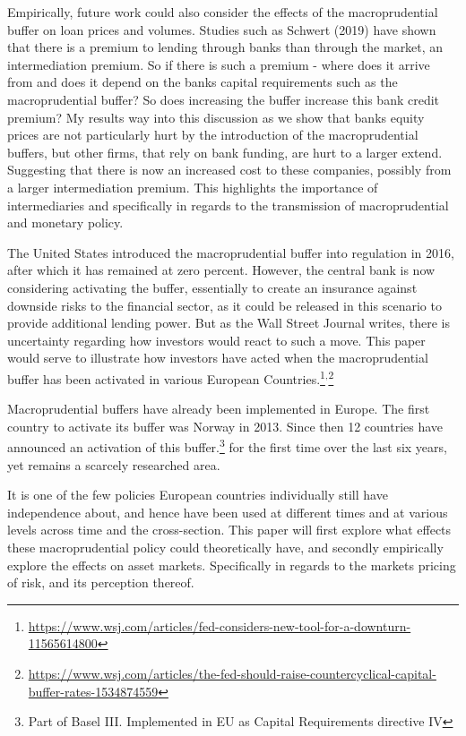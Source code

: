 \documentclass[11pt]{article}
\begin{document}
Empirically, future work could also consider the effects of the macroprudential buffer on loan prices and volumes.
Studies such as Schwert (2019) have shown that there is a premium to lending through banks than through the market, an intermediation premium. So if there is such a premium - where does it arrive from and does it depend on the banks capital requirements such as the macroprudential buffer? So does increasing the buffer increase this bank credit premium? My results way into this discussion as we show that banks equity prices are not particularly hurt by the introduction of the macroprudential buffers, but other firms, that rely on bank funding, are hurt to a larger extend. Suggesting that there is now an increased cost to these companies, possibly from a larger intermediation premium. This highlights the importance of intermediaries and specifically in regards to the transmission of macroprudential and monetary policy.


The United States introduced the macroprudential buffer into regulation in 2016, after which it has remained at zero percent. However, the central bank is now considering activating the buffer, essentially to create an insurance against downside risks to the financial sector, as it could be released in this scenario to provide additional lending power. But as the Wall Street Journal writes, there is uncertainty regarding how investors would react to such a move. This paper would serve to illustrate how investors have acted when the macroprudential buffer has been activated in various European Countries.\footnote{
\url{https://www.wsj.com/articles/fed-considers-new-tool-for-a-downturn-11565614800}}$^,$\footnote{
\url{https://www.wsj.com/articles/the-fed-should-raise-countercyclical-capital-buffer-rates-1534874559}}

Macroprudential buffers have already been implemented in Europe. The first country to activate its buffer was Norway in 2013. Since then 12 countries have announced an activation of this buffer.\footnote{Part of Basel III. Implemented in EU as Capital Requirements directive IV} for the first time over the last six years, yet remains a scarcely researched area. 

It is one of the few policies European countries individually still have independence about, and hence have been used at different times and at various levels across time and the cross-section. This paper will first explore what effects these macroprudential policy could theoretically have, and secondly empirically explore the effects on asset markets. Specifically in regards to the markets pricing of risk, and its perception thereof.
\end{document}
